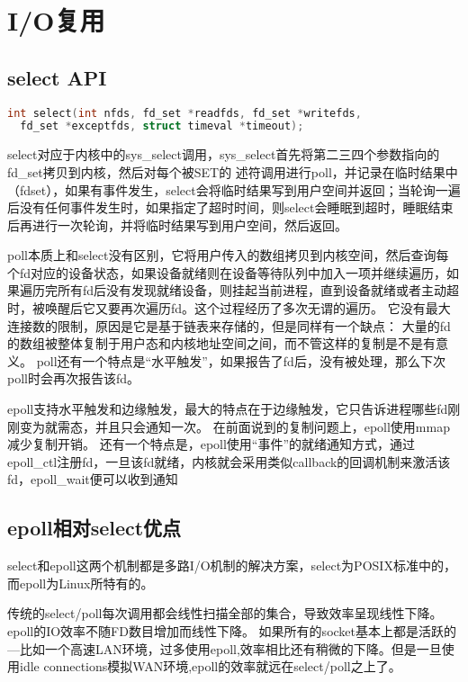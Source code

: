 \section{I/O复用}

\subsection{select API}

\begin{lstlisting}[language=C++]
int select(int nfds, fd_set *readfds, fd_set *writefds, 
  fd_set *exceptfds, struct timeval *timeout);
\end{lstlisting}

select对应于内核中的sys\_select调用，sys\_select首先将第二三四个参数指向的fd\_set拷贝到内核，然后对每个被SET的 述符调用进行poll，并记录在临时结果中（fdset），如果有事件发生，select会将临时结果写到用户空间并返回；当轮询一遍后没有任何事件发生时，如果指定了超时时间，则select会睡眠到超时，睡眠结束后再进行一次轮询，并将临时结果写到用户空间，然后返回。

poll本质上和select没有区别，它将用户传入的数组拷贝到内核空间，然后查询每个fd对应的设备状态，如果设备就绪则在设备等待队列中加入一项并继续遍历，如果遍历完所有fd后没有发现就绪设备，则挂起当前进程，直到设备就绪或者主动超时，被唤醒后它又要再次遍历fd。这个过程经历了多次无谓的遍历。
它没有最大连接数的限制，原因是它是基于链表来存储的，但是同样有一个缺点：
大量的fd的数组被整体复制于用户态和内核地址空间之间，而不管这样的复制是不是有意义。
poll还有一个特点是“水平触发”，如果报告了fd后，没有被处理，那么下次poll时会再次报告该fd。

epoll支持水平触发和边缘触发，最大的特点在于边缘触发，它只告诉进程哪些fd刚刚变为就需态，并且只会通知一次。
在前面说到的复制问题上，epoll使用mmap减少复制开销。
还有一个特点是，epoll使用“事件”的就绪通知方式，通过epoll\_ctl注册fd，一旦该fd就绪，内核就会采用类似callback的回调机制来激活该fd，epoll\_wait便可以收到通知


\subsection{epoll相对select优点}
select和epoll这两个机制都是多路I/O机制的解决方案，select为POSIX标准中的，而epoll为Linux所特有的。

传统的select/poll每次调用都会线性扫描全部的集合，导致效率呈现线性下降。
epoll的IO效率不随FD数目增加而线性下降。
如果所有的socket基本上都是活跃的---比如一个高速LAN环境，过多使用epoll,效率相比还有稍微的下降。但是一旦使用idle connections模拟WAN环境,epoll的效率就远在select/poll之上了。

